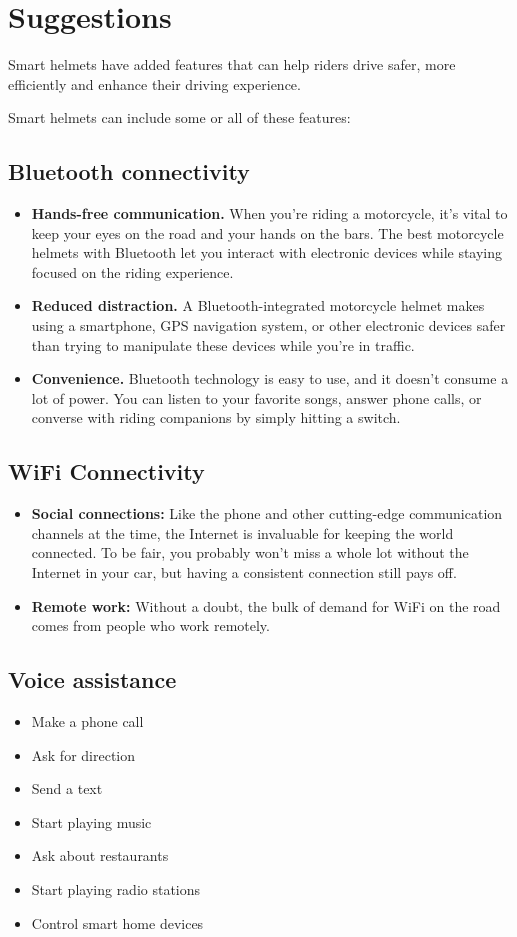 \chapter{Suggestions}
Smart helmets have added features that can help riders drive safer, more efficiently and enhance their driving experience.\vspace{.3cm} 

Smart helmets can include some or all of these features:
\section{Bluetooth connectivity}
\begin{itemize}
	\item \textbf{Hands-free communication. }When you're riding a motorcycle, it's vital to keep your eyes on the road and your hands on the bars. The best motorcycle helmets with Bluetooth let you interact with electronic devices while staying focused on the riding experience.
	\item \textbf{Reduced distraction. }A Bluetooth-integrated motorcycle helmet makes using a smartphone, GPS navigation system, or other electronic devices safer than trying to manipulate these devices while you’re in traffic.
	\item \textbf{Convenience.} Bluetooth technology is easy to use, and it doesn't consume a lot of power. You can listen to your favorite songs, answer phone calls, or converse with riding companions by simply hitting a switch.
\end{itemize}
\section{WiFi Connectivity}
\begin{itemize}
	\item \textbf{Social connections:} Like the phone and other cutting-edge communication channels at the time, the Internet is invaluable for keeping the world connected. To be fair, you probably won’t miss a whole lot without the Internet in your car, but having a consistent connection still pays off.
	
	\item \textbf{Remote work:} Without a doubt, the bulk of demand for WiFi on the road comes from people who work remotely.
	
	
\end{itemize} 
\section{Voice assistance }
\begin{itemize}
	\item Make a phone call
	\item Ask for direction
	\item Send a text
	\item Start playing music
	\item Ask about restaurants
	\item Start playing radio stations
	\item Control smart home devices
\end{itemize}
